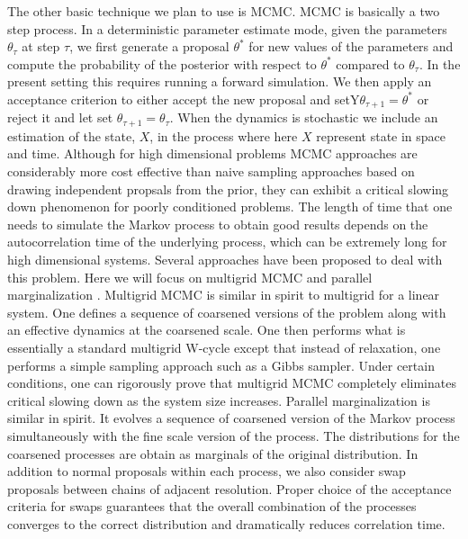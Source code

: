 \documentclass[11pt]{article}
\newcommand{\MarginPar}[1]{\marginpar{%
\vskip-\baselineskip %
\raggedright\tiny\sffamily
\hrule\smallskip{\color{red}#1}\par\smallskip\hrule}}
\begin{document}
\MarginPar{Jonathan please fix}
The other basic technique we plan to use is MCMC.
MCMC is basically a two step process.
In a deterministic parameter estimate mode, given the parameters $\theta_\tau$ at step $\tau$,
we first generate a proposal $\theta^*$ for new values of the parameters and compute
the probability of the posterior with respect to $\theta^*$ compared to $\theta_\tau$.
In the present setting this requires running a forward simulation.  We then apply an
acceptance criterion to either accept the new proposal and setY$\theta_{\tau+1} = \theta^*$
or reject it and let set $\theta_{\tau+1} = \theta_\tau$.
When the dynamics is stochastic we include an estimation of the state, $X$,
in the process where here $X$ represent state in space and time.
Although for high dimensional problems MCMC approaches are considerably more cost
effective than naive sampling approaches based on drawing independent propsals
from the prior, they can
exhibit a critical slowing down phenomenon for poorly conditioned problems.
The length of time that
one needs to simulate the Markov process to obtain good results depends on the autocorrelation time
of the underlying process, which can be extremely long for high dimensional systems.
Several approaches have been proposed to deal with this problem.
\MarginPar{JBB:  Jonathan check}
Here we will focus on multigrid MCMC \cite{Goodman1989}
and parallel marginalization \cite{Weare2007}.
Multigrid MCMC is similar in spirit to multigrid for a linear system.  One
defines a sequence of coarsened versions of the problem along with an effective
dynamics at the coarsened scale.  One then performs what is essentially a standard
multigrid W-cycle except that instead of relaxation, one performs a simple sampling
approach such as a Gibbs sampler.  Under certain conditions, one can rigorously
prove that multigrid MCMC completely eliminates critical slowing down as the
system size increases.
Parallel marginalization is similar in spirit. It evolves a sequence of coarsened
version of the Markov process
simultaneously with the fine scale version of the process. 
The distributions for the coarsened processes are obtain as marginals of the original
distribution.  In addition to normal proposals within each process, we also consider
swap proposals between chains of adjacent resolution.  Proper choice of the acceptance
criteria for swaps guarantees that the overall combination of the processes converges
to the correct distribution and dramatically reduces correlation time.
\end{document}
